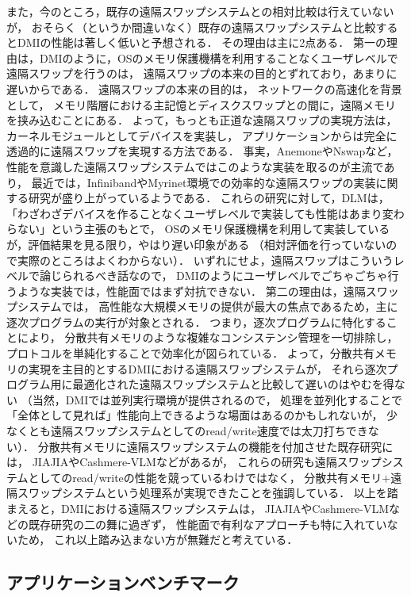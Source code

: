 \documentclass[10pt]{jsarticle}
\begin{document}
また，今のところ，既存の遠隔スワップシステムとの相対比較は行えていないが，
おそらく（というか間違いなく）既存の遠隔スワップシステムと比較するとDMIの性能は著しく低いと予想される．
その理由は主に2点ある．
第一の理由は，DMIのように，OSのメモリ保護機構を利用することなくユーザレベルで遠隔スワップを行うのは，
遠隔スワップの本来の目的とずれており，あまりに遅いからである．
遠隔スワップの本来の目的は，
ネットワークの高速化を背景として，
メモリ階層における主記憶とディスクスワップとの間に，遠隔メモリを挟み込むことにある．
よって，もっとも正道な遠隔スワップの実現方法は，
カーネルモジュールとしてデバイスを実装し，
アプリケーションからは完全に透過的に遠隔スワップを実現する方法である．
事実，AnemoneやNswapなど，性能を意識した遠隔スワップシステムではこのような実装を取るのが主流であり，
最近では，InfinibandやMyrinet環境での効率的な遠隔スワップの実装に関する研究が盛り上がっているようである．
これらの研究に対して，DLMは，
「わざわざデバイスを作ることなくユーザレベルで実装しても性能はあまり変わらない」という主張のもとで，
OSのメモリ保護機構を利用して実装しているが，評価結果を見る限り，やはり遅い印象がある
（相対評価を行っていないので実際のところはよくわからない）．
いずれにせよ，遠隔スワップはこういうレベルで論じられるべき話なので，
DMIのようにユーザレベルでごちゃごちゃ行うような実装では，性能面ではまず対抗できない．
第二の理由は，遠隔スワップシステムでは，
高性能な大規模メモリの提供が最大の焦点であるため，主に逐次プログラムの実行が対象とされる．
つまり，逐次プログラムに特化することにより，
分散共有メモリのような複雑なコンシステンシ管理を一切排除し，
プロトコルを単純化することで効率化が図られている．
よって，分散共有メモリの実現を主目的とするDMIにおける遠隔スワップシステムが，
それら逐次プログラム用に最適化された遠隔スワップシステムと比較して遅いのはやむを得ない
（当然，DMIでは並列実行環境が提供されるので，
処理を並列化することで「全体として見れば」性能向上できるような場面はあるのかもしれないが，
少なくとも遠隔スワップシステムとしてのread/write速度では太刀打ちできない）．
分散共有メモリに遠隔スワップシステムの機能を付加させた既存研究には，
JIAJIAやCashmere-VLMなどがあるが，
これらの研究も遠隔スワップシステムとしてのread/writeの性能を競っているわけではなく，
分散共有メモリ$+$遠隔スワップシステムという処理系が実現できたことを強調している．
以上を踏まえると，DMIにおける遠隔スワップシステムは，
JIAJIAやCashmere-VLMなどの既存研究の二の舞に過ぎず，
性能面で有利なアプローチも特に入れていないため，
これ以上踏み込まない方が無難だと考えている．

\subsection{アプリケーションベンチマーク}
\end{document}
